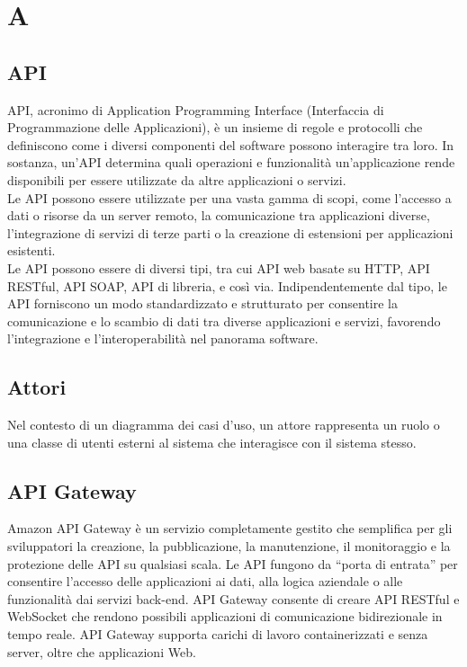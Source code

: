 \documentclass{article}
\begin{document}
\section{A}
\subsection{API}
API, acronimo di Application Programming Interface (Interfaccia di Programmazione delle Applicazioni), è un insieme di regole e protocolli che definiscono come i diversi componenti del software possono interagire tra loro. In sostanza, un'API determina quali operazioni e funzionalità un'applicazione rende disponibili per essere utilizzate da altre applicazioni o servizi.\\
Le API possono essere utilizzate per una vasta gamma di scopi, come l'accesso a dati o risorse da un server remoto, la comunicazione tra applicazioni diverse, l'integrazione di servizi di terze parti o la creazione di estensioni per applicazioni esistenti.\\
Le API possono essere di diversi tipi, tra cui API web basate su HTTP, API RESTful, API SOAP, API di libreria, e così via. Indipendentemente dal tipo, le API forniscono un modo standardizzato e strutturato per consentire la comunicazione e lo scambio di dati tra diverse applicazioni e servizi, favorendo l'integrazione e l'interoperabilità nel panorama software.

\subsection{Attori}
Nel contesto di un diagramma dei casi d'uso, un attore rappresenta un ruolo o una classe di utenti esterni al sistema che interagisce con il sistema stesso.

\subsection{API Gateway}
Amazon API Gateway è un servizio completamente gestito che semplifica per gli sviluppatori la creazione, la pubblicazione, la manutenzione, il monitoraggio e la protezione delle API su qualsiasi scala. Le API fungono da “porta di entrata” per consentire l’accesso delle applicazioni ai dati, alla logica aziendale o alle funzionalità dai servizi back-end. API Gateway consente di creare API RESTful e WebSocket che rendono possibili applicazioni di comunicazione bidirezionale in tempo reale. API Gateway supporta carichi di lavoro containerizzati e senza server, oltre che applicazioni Web.
\end{document}
